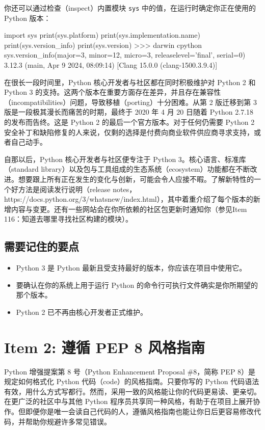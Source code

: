 你还可以通过检查（inspect）内置模块 \texttt{sys} 中的值，在运行时确定你正在使用的 Python 版本：

\begin{codebox}[python]
import sys
print(sys.platform)
print(sys.implementation.name)
print(sys.version_info)
print(sys.version)
>>>
darwin
cpython
sys.version_info(major=3, minor=12, micro=3,
releaselevel='final', serial=0)
3.12.3 (main, Apr  9 2024, 08:09:14)
[Clang 15.0.0 (clang-1500.3.9.4)]
\end{codebox}

在很长一段时间里，Python 核心开发者与社区都在同时积极维护对 Python 2 和 Python 3 的支持。这两个版本在重要方面存在差异，并且存在兼容性（incompatibilities）问题，导致移植（porting）十分困难。从第 2 版迁移到第 3 版是一段极其漫长而痛苦的时期，最终于 2020 年 4 月 20 日随着 Python 2.7.18 的发布而告终。这是 Python 2 的最后一个官方版本。对于任何仍需要 Python 2 安全补丁和缺陷修复的人来说，仅剩的选择是付费向商业软件供应商寻求支持，或者自己动手。

自那以后，Python 核心开发者与社区便专注于 Python 3。核心语言、标准库（standard library）以及包与工具组成的生态系统（ecosystem）功能都在不断改进。想要跟上所有正在发生的变化与创新，可能会令人应接不暇。了解新特性的一个好方法是阅读发行说明（release notes，https://docs.python.org/3/whatsnew/index.html），其中着重介绍了每个版本的新增内容与变更。还有一些网站会在你所依赖的社区包更新时通知你（参见Item 116：知道去哪里寻找社区构建的模块）。

\subsection{需要记住的要点}

\begin{itemize}
\item Python 3 是 Python 最新且受支持最好的版本，你应该在项目中使用它。
\item 要确认在你的系统上用于运行 Python 的命令行可执行文件确实是你所期望的那个版本。
\item Python 2 已不再由核心开发者正式维护。
\end{itemize}

\section{Item 2: 遵循 PEP 8 风格指南}

Python 增强提案第 8 号（Python Enhancement Proposal \#8，简称 PEP 8）是规定如何格式化 Python 代码（code）的风格指南。只要你写的 Python 代码语法有效，用什么方式写都行。然而，采用一致的风格能让你的代码更易读、更亲切。在更广泛的社区中与其他 Python 程序员共享同一种风格，有助于在项目上展开协作。但即便你是唯一会读自己代码的人，遵循风格指南也能让你日后更容易修改代码，并帮助你规避许多常见错误。

